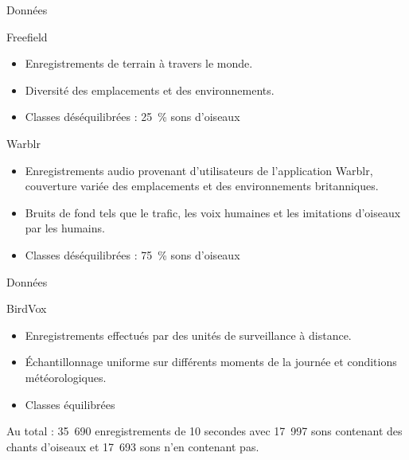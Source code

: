 \documentclass[compress,xcolor=table]{beamer}
\begin{document}
\begin{frame}{Données}

    \begin{exampleblock}{Freefield}
        \begin{itemize}
            \item Enregistrements de terrain à travers le monde.
            \item Diversité des emplacements et des environnements.
            \item \warning Classes déséquilibrées : 25~\% sons d'oiseaux
        \end{itemize}
    \end{exampleblock}

    \begin{exampleblock}{Warblr}
        \begin{itemize}
            \item Enregistrements audio provenant d'utilisateurs de l'application Warblr, couverture variée des emplacements et des environnements britanniques.
            \item Bruits de fond tels que le trafic, les voix humaines et les imitations d'oiseaux par les humains.
            \item \warning Classes déséquilibrées : 75~\% sons d'oiseaux
        \end{itemize}
    \end{exampleblock}

\end{frame}

\begin{frame}{Données}

    \begin{exampleblock}{BirdVox}
        \begin{itemize}
            \item Enregistrements effectués par des unités de surveillance à distance.
            \item Échantillonnage uniforme sur différents moments de la journée et conditions météorologiques.
            \item Classes équilibrées
        \end{itemize}
    \end{exampleblock}

    Au total : 35~690 enregistrements de 10 secondes avec 17~997 sons contenant des chants d'oiseaux et 17~693 sons n'en contenant pas.

\end{frame}
\end{document}
